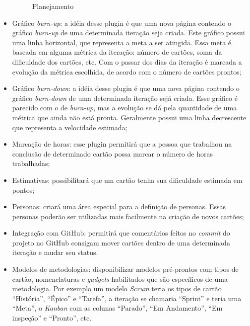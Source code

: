 \begin{itemize}
{	\begin{figure}[H]
	  \centering
	  \caption{Planejamento}\label{figura:planejamento}
	\end{figure}
	}
	\item{Gráfico \textit{burn-up}: a idéia desse plugin é que uma nova página contendo o gráfico \textit{burn-up} de uma determinada iteração seja criada. Este gráfico possui uma linha horizontal, que representa a meta a ser atingida. Essa meta é baseada em alguma métrica da iteração: número de cartões, soma da dificuldade dos cartões, etc. Com o passar dos dias da iteração é marcada a evolução da métrica escolhida, de acordo com o número de cartões prontos;}
	\item{Gráfico \textit{burn-down}: a idéia desse plugin é que uma nova página contendo o gráfico \textit{burn-down} de uma determinada iteração sejá criada. Esse gráfico é parecido com o de \textit{burn-up}, mas a evolução se dá pela quantidade de uma métrica que ainda não está pronta. Geralmente possui uma linha decrescente que representa a velocidade estimada;}
	\item{Marcação de horas: esse plugin permitirá que a pessoa que trabalhou na conclusão de determinado cartão possa marcar o número de horas trabalhadas;}
	\item{Estimativas: possibilitará que um cartão tenha sua dificuldade estimada em pontos;}
	\item{Personas: criará uma área especial para a definição de personas. Essas personas poderão ser utilizadas mais facilmente na criação de novos cartões;}
	\item{Integração com GitHub: permitirá que comentários feitos no \textit{commit} do projeto no GitHub consigam mover cartões dentro de uma determinada iteração e mudar seu status.}
	\item{Modelos de metodologias: disponibilizar modelos pré-prontos com tipos de cartão, nomenclaturas e \textit{gadgets} habilitados que são específicos de uma metodologia. Por exemplo um modelo \textit{Scrum} teria os tipos de cartão ``História'', ``Épico'' e ``Tarefa'', a iteração se chamaria ``Sprint'' e teria uma ``Meta'', o \textit{Kanban} com as colunas ``Parado'', ``Em Andamento'', ``Em inspeção'' e ``Pronto'', etc.}
\end{itemize}
